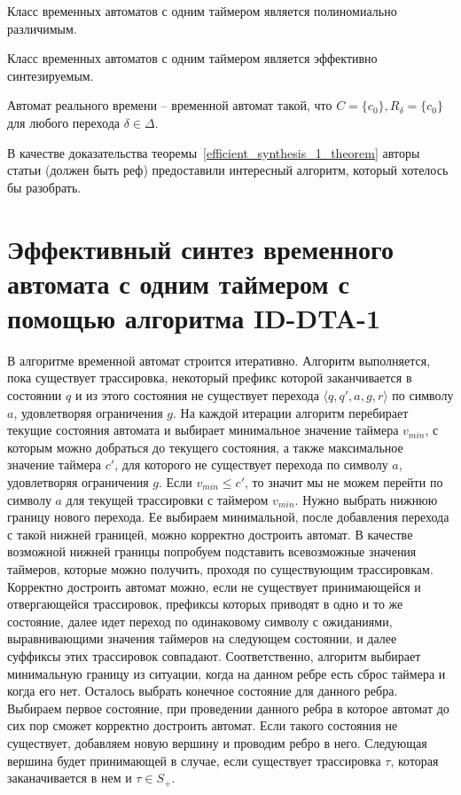 \documentclass[times,specification,annotation]{itmo-student-thesis}
\begin{document}
\begin{lemma}
  Класс временных автоматов с одним таймером является полиномиально различимым.
  \label{distinguishability_1_lemma}
\end{lemma}

\begin{theorem}
  Класс временных автоматов с одним таймером является эффективно синтезируемым.
  \label{efficient_synthesis_1_theorem}
\end{theorem}

\begin{definition}
  Автомат реального времени -- временной автомат такой, что $C = \{c_0\}, R_{\delta} = \{c_0\}$ для любого перехода $\delta \in \Delta$.
  \label{rti}
\end{definition}

В качестве доказательства теоремы~\ref{efficient_synthesis_1_theorem} авторы статьи (должен быть реф) предоставили интересный алгоритм, который хотелось бы разобрать.

\section{Эффективный синтез временного автомата с одним таймером с помощью алгоритма ID-DTA-1}

В алгоритме временной автомат строится итеративно. Алгоритм выполняется, пока существует трассировка, 
некоторый префикс которой заканчивается в состоянии $q$ и из этого состояния не существует перехода $\langle q, q', a, g, r \rangle$ по символу $a$, удовлетворяя ограничения $g$.
На каждой итерации алгоритм перебирает текущие состояния автомата и выбирает минимальное значение таймера $v_{min}$, с которым можно добраться до текущего состояния,
а также максимальное значение таймера $c'$, для которого не существует перехода по символу $a$, удовлетворяя ограничения $g$. Если $v_{min} \leq c'$, то значит мы не можем перейти по
символу $a$ для текущей трассировки с таймером $v_{min}$. Нужно выбрать нижнюю границу нового перехода. Ее выбираем минимальной, после добавления перехода с такой нижней границей,
можно корректно достроить автомат. В качестве возможной нижней границы попробуем подставить всевозможные значения таймеров, которые можно получить, проходя по существующим трассировкам.
Корректно достроить автомат можно, если не существует принимающейся и отвергающейся трассировок, префиксы которых приводят в одно и то же состояние,
далее идет переход по одинаковому символу с ожиданиями, выравнивающими значения таймеров на следующем состоянии, и далее суффиксы этих трассировок совпадают. Соответственно, алгоритм
выбирает минимальную границу из ситуации, когда на данном ребре есть сброс таймера и когда его нет. Осталось выбрать конечное состояние для данного ребра. Выбираем первое состояние,
при проведении данного ребра в которое автомат до сих пор сможет корректно достроить автомат. Если такого состояния не существует, добавляем новую вершину и проводим ребро в него.
Следующая вершина будет принимающей в случае, если существует трассировка $\tau$, которая заканачивается в нем и $\tau \in S_+$.
\end{document}
